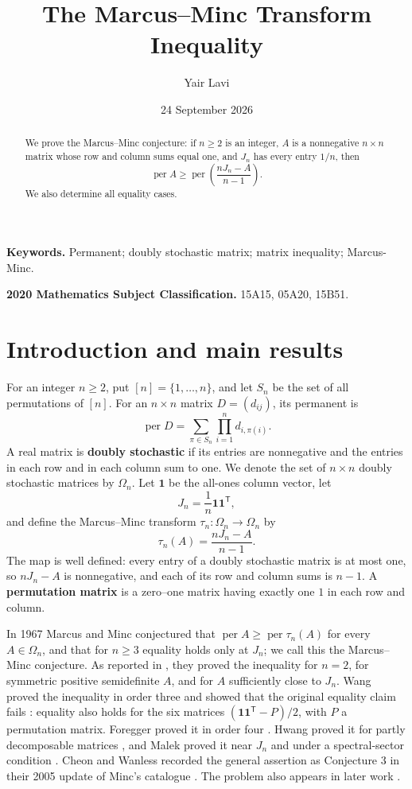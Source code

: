 \documentclass[11pt]{article}
\title{The Marcus--Minc Transform Inequality}
\author{Yair Lavi}
\date{24 September 2026}
\begin{document}
\maketitle

\begin{abstract}
We prove the Marcus--Minc conjecture: if $n\ge2$ is an integer,
$A$ is a nonnegative $n\times n$ matrix whose row and column sums equal one,
and $J_n$ has every entry $1/n$, then
\[
\operatorname{per}A\ge
\operatorname{per}\!\left(\frac{nJ_n-A}{n-1}\right).
\]
We also determine all equality cases.
\end{abstract}

\noindent\textbf{Keywords.} Permanent; doubly stochastic matrix; matrix inequality; Marcus-Minc.

\noindent\textbf{2020 Mathematics Subject Classification.} 15A15, 05A20, 15B51.

\section{Introduction and main results}

For an integer $n\ge2$, put $[n]=\{1,\ldots,n\}$, and let $S_n$ be the set
of all permutations of $[n]$. For an $n\times n$ matrix $D=(d_{ij})$, its
permanent is
\[
\operatorname{per}D=\sum_{\pi\in S_n}\prod_{i=1}^n d_{i,\pi(i)}.
\tag{1.1}
\]
A real matrix is \textbf{doubly stochastic} if its entries are nonnegative and the
entries in each row and in each column sum to one. We denote the set of
$n\times n$ doubly stochastic matrices by $\Omega_n$. Let $\mathbf1$ be the
all-ones column vector, let
\[
J_n=\frac1n\mathbf1\mathbf1^{\mathsf T},
\]
and define the Marcus--Minc transform $\tau_n:\Omega_n\to\Omega_n$ by
\[
\tau_n(A)=\frac{nJ_n-A}{n-1}.
\tag{1.2}
\]
The map is well defined: every entry of a doubly stochastic matrix is at most
one, so $nJ_n-A$ is nonnegative, and each of its row and column sums is
$n-1$. A \textbf{permutation matrix} is a zero--one matrix having exactly one $1$
in each row and column.

In 1967 Marcus and Minc \cite{ref1} conjectured that
$\operatorname{per}A\ge\operatorname{per}\tau_n(A)$ for every $A\in\Omega_n$,
and that for $n\ge3$ equality holds only at $J_n$; we call this the
Marcus--Minc conjecture. As reported in \cite{ref7,ref9}, they proved the inequality
for $n=2$, for symmetric positive semidefinite $A$, and for $A$ sufficiently
close to $J_n$. Wang proved the inequality in order three and showed that
the original equality claim fails \cite{ref2}: equality also holds for the six matrices
$(\mathbf1\mathbf1^{\mathsf T}-P)/2$, with $P$ a permutation matrix.
Foregger proved it in order four \cite{ref3}. Hwang proved it for partly decomposable
matrices \cite{ref4}, and Malek proved it near $J_n$ and under a spectral-sector
condition \cite{ref5,ref6}. Cheon and Wanless recorded the general assertion as
Conjecture 3 in their 2005 update of Minc's catalogue \cite{ref6}. The problem also
appears in later work \cite{ref7,ref8,ref9}.
\end{document}
